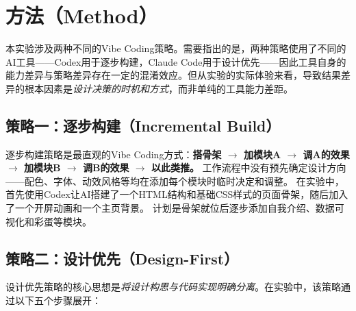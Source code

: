 \section{方法（Method）}

本实验涉及两种不同的Vibe Coding策略。需要指出的是，两种策略使用了不同的AI工具——Codex用于逐步构建，Claude Code用于设计优先——因此工具自身的能力差异与策略差异存在一定的混淆效应。但从实验的实际体验来看，导致结果差异的根本因素是\textit{设计决策的时机和方式}，而非单纯的工具能力差距。

\subsection{策略一：逐步构建（Incremental Build）}

逐步构建策略是最直观的Vibe Coding方式：\textbf{搭骨架 $\rightarrow$ 加模块A $\rightarrow$ 调A的效果 $\rightarrow$ 加模块B $\rightarrow$ 调B的效果 $\rightarrow$ 以此类推。}
工作流程中没有预先确定设计方向——配色、字体、动效风格等均在添加每个模块时临时决定和调整。
在实验中，首先使用Codex让AI搭建了一个HTML结构和基础CSS样式的页面骨架，随后加入了一个开屏动画和一个主页背景。
计划是骨架就位后逐步添加自我介绍、数据可视化和彩蛋等模块。

\subsection{策略二：设计优先（Design-First）}

设计优先策略的核心思想是\textit{将设计构思与代码实现明确分离}。在实验中，该策略通过以下五个步骤展开：

